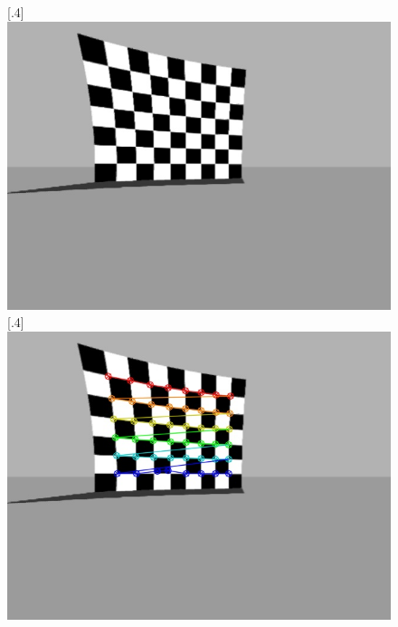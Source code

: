 \begin{figure}[h]
	\centering
	\subcaptionbox{}%
	[.4\linewidth]{\includegraphics[scale=.2]{chapters/03_background/img/gazebo_calib_left.jpg}}
	\subcaptionbox{}%
	[.4\linewidth]{\includegraphics[scale=.2]{chapters/03_background/img/gazebo_corners.jpg}}
	\caption{}
	\label{fig::323_distortion}
\end{figure}
